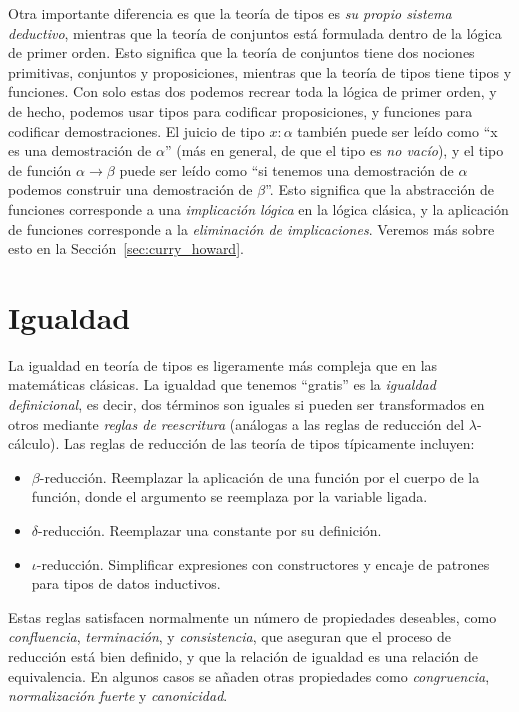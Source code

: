 \documentclass[
  a4paper, 
  10pt, 
  parskip=half, 
  toc=bibliography,
]{scrbook}
\theoremstyle{definition}
\theoremstyle{bolddef}
\begin{document}
Otra importante diferencia es que la teoría de tipos es \emph{su propio sistema
deductivo}, mientras que la teoría de conjuntos está formulada dentro de la
lógica de primer orden. Esto significa que la teoría de conjuntos tiene dos
nociones primitivas, conjuntos y proposiciones, mientras que la teoría de tipos
tiene tipos y funciones. Con solo estas dos podemos recrear toda la lógica de primer
orden, y de hecho, podemos usar tipos para codificar proposiciones, y funciones
para codificar demostraciones. El juicio de tipo \(x: \alpha\) también puede ser leído como
\enquote{x es una demostración de \(\alpha\)} (más en general, de que el tipo es \emph{no vacío}), y el tipo de función \(\alpha \to \beta\) puede ser leído como
\enquote{si tenemos una demostración de \(\alpha\) podemos construir una demostración de
\(\beta\)}. Esto significa que la abstracción de funciones corresponde a una
\emph{implicación lógica} en la lógica clásica, y la aplicación de funciones
corresponde a la \emph{eliminación de implicaciones}. Veremos más sobre esto en la
Sección~\ref{sec:curry_howard}.

\section{Igualdad}

La igualdad en teoría de tipos es ligeramente más compleja que en las matemáticas
clásicas. La igualdad que tenemos \enquote{gratis} es la \emph{igualdad
definicional}, es decir, dos términos son iguales si pueden ser transformados
en otros mediante \emph{reglas de reescritura} (análogas a las reglas de reducción
del \(\lambda\)-cálculo). Las reglas de reducción de las teoría de tipos
típicamente incluyen:
\begin{itemize}
  \item \(\beta\)-reducción. Reemplazar la aplicación de una función por el
    cuerpo de la función, donde el argumento se reemplaza por la variable ligada.
  \item \(\delta\)-reducción. Reemplazar una constante por su definición.
  \item \(\iota\)-reducción. Simplificar expresiones con constructores y encaje
    de patrones para tipos de datos inductivos.
\end{itemize}

Estas reglas satisfacen normalmente un número de propiedades deseables, como
\emph{confluencia}, \emph{terminación}, y \emph{consistencia}, que aseguran que el
proceso de reducción está bien definido, y que la relación de igualdad es una
relación de equivalencia. En algunos casos se añaden otras propiedades como
\emph{congruencia}, \emph{normalización fuerte} y \emph{canonicidad}.
\end{document}
